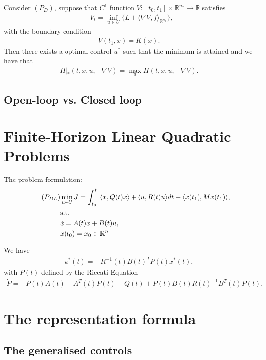 \begin{theorem}
	Consider $(P_D)$, suppose that $C^1$ function $V: [t_0, t_1] \times \mathbb{R}^{n_x} \rightarrow \mathbb{R} $ satisfies
	\begin{align*}
		-V_t = \inf_{u \in U} \bigg\{L + \langle \nabla V, f \rangle_{\mathbb{R}^{n_x}} \bigg\},
	\end{align*}
	with the boundary condition
	\begin{align*}
		V(t_1, x) = K(x). 
	\end{align*}
	Then there exists a optimal control $u^*$ such that the minimum is attained and we have
	that
	\begin{align*}
		H|_*(t, x, u, - \nabla V) = \max_u H(t, x, u, -\nabla V ). 
	\end{align*}
\end{theorem} 

\subsection{Open-loop vs. Closed loop}


\section{Finite-Horizon Linear Quadratic Problems}
The problem formulation:
\begin{align}
	\tag{$P_{DL}$}\label{prob:PDL}
	& \min_{u \in U} J = \int_{t_0}^{t_1} \langle x, Q(t)x\rangle  + \langle u, R(t)u \rangle dt + \langle x(t_1), M x(t_1) \rangle , \\
	&\text{s.t.}\\
	& \dot{x} = A(t) x + B(t)u, \\
	& x(t_0) = x_0 \in \mathbb{R}^n
\end{align}


We have
\begin{align*}
	u^*(t) = - R^{-1}(t) B(t)^T P(t) x^*(t),
\end{align*}
with $P(t)$ defined by the Riccati Equation
\begin{align*}
	\dot{P} = -P(t) A(t) - A^T(t) P(t) - Q(t) + P(t)B(t)R(t)^{-1} B^T(t)P(t). 
\end{align*}


\section{The representation formula}
\subsection{The generalised controls}


